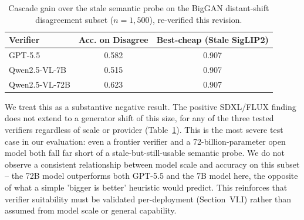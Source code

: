 

\begin{table}[h]
\centering
\caption{Cascade gain over the stale semantic probe on the BigGAN distant-shift disagreement subset ($n=1{,}500$), re-verified this revision.\footnotemark}
\label{tab:biggan_shift}
\footnotesize
\setlength{\tabcolsep}{3pt}
\begin{tabular}{l c c}
\toprule
Verifier & Acc. on Disagree & Best-cheap (Stale SigLIP2) \\
\midrule
GPT-5.5 & 0.582 & 0.907 \\
Qwen2.5-VL-7B & 0.515 & 0.907 \\
Qwen2.5-VL-72B & 0.623 & 0.907 \\
\bottomrule
\end{tabular}
\end{table}


We treat this as a substantive negative result. The positive SDXL/FLUX
finding does not extend to a generator shift of this size, for any of the
three tested verifiers regardless of scale or provider (Table~\ref{tab:biggan_shift}).
This is the most severe test case in our evaluation: even a frontier
verifier and a 72-billion-parameter open model both fall far short of a
stale-but-still-usable semantic probe. We do not observe a consistent
relationship between model scale and accuracy on this subset -- the
72B model outperforms both GPT-5.5 and the 7B model here, the opposite of
what a simple 'bigger is better' heuristic would predict. This
reinforces that verifier suitability must be validated per-deployment
(Section~VI.I) rather than assumed from model scale or general capability.


